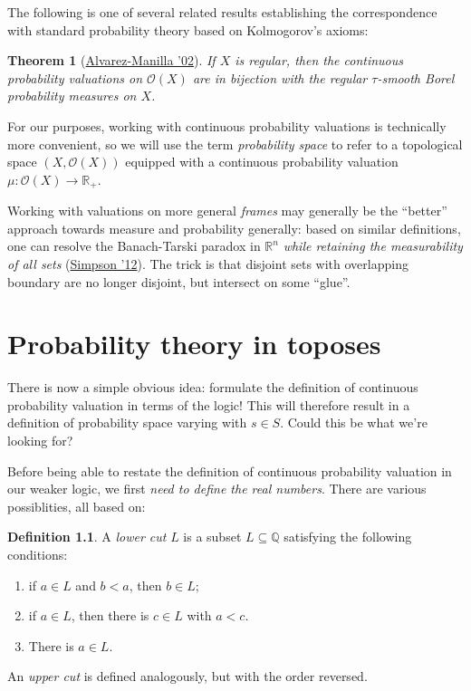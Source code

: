 \documentclass[11pt, oneside, article]{memoir}
\theoremstyle{plain}
\newtheorem{theorem}{Theorem}[chapter] %
\theoremstyle{definition}
\newtheorem{definition}[theorem]{Definition}
\theoremstyle{remark}
\newcommand{\Open}[1]{\mathcal{O}(#1)}
\newcommand{\R}{\mathbb{R}}
\begin{document}
The following is one of several related results establishing the correspondence with standard probability theory based on Kolmogorov's axioms:

\begin{theorem}[\href{https://www.sciencedirect.com/science/article/pii/S0166864101002498}{Alvarez-Manilla '02}]
If $X$ is regular, then the continuous probability valuations on $\Open{X}$ are in bijection with the regular $\tau$-smooth Borel probability measures on $X$.
\end{theorem}

For our purposes, working with continuous probability valuations is technically more convenient, so we will use the term \emph{probability space} to refer to a topological space $(X,\Open{X})$ equipped with a continuous probability valuation $\mu : \Open{X}\to\R_+$.

Working with valuations on more general \emph{frames} may generally be the ``better'' approach towards measure and probability generally: based on similar definitions, one can resolve the Banach-Tarski paradox in $\R^n$ \emph{while retaining the measurability of all sets} (\href{https://www.sciencedirect.com/science/article/pii/S0168007211001874}{Simpson '12}). The trick is that disjoint sets with overlapping boundary are no longer disjoint, but intersect on some ``glue''.

\chapter{Probability theory in toposes}

There is now a simple obvious idea: formulate the definition of continuous probability valuation in terms of the logic! This will therefore result in a definition of probability space varying with $s \in S$. Could this be what we're looking for?

Before being able to restate the definition of continuous probability valuation in our weaker logic, we first \emph{need to define the real numbers}. There are various possiblities, all based on:

\newcommand{\Q}{\mathbb{Q}}

\begin{definition}
A \emph{lower cut} $L$ is a subset $L\subseteq\Q$ satisfying the following conditions:
\begin{enumerate}
\item if $a \in L$ and $b < a$, then $b\in L$;
\item if $a \in L$, then there is $c\in L$ with $a < c$.
\item There is $a\in L$.
\end{enumerate}
An \emph{upper cut} is defined analogously, but with the order reversed.
\end{definition}
\end{document}
